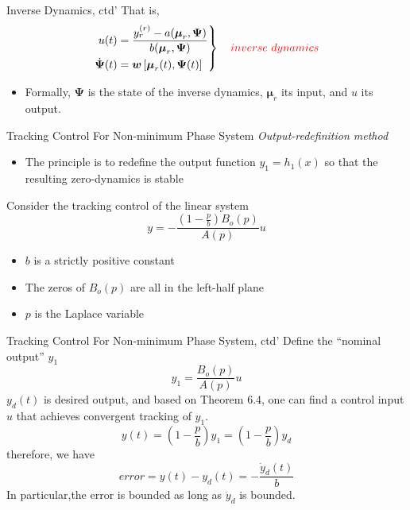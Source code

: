 \documentclass{beamer}
\renewcommand{\vec}[1]{\ensuremath{\boldsymbol{#1}}} %
\begin{document}
\begin{frame}{Inverse Dynamics, ctd'}
    That is, 
    \begin{equation}\label{inverse-dynamics}
      \left. \begin{aligned}
        u(t) &= \frac{y_{r}^{(r)}-a(\vec{\mu}_{r}, \vec{\Psi})}{b(\vec{\mu}_{r}, \vec{\Psi})} \\
        \dot{\vec{\Psi}}(t) &= \vec{w}\left[ \vec{\mu}_{r}(t),\vec{\Psi}(t) \right]
      \end{aligned} \right\} \quad {\color{red}inverse ~dynamics}
    \end{equation}
    \begin{itemize}
      \item Formally, $\vec{\Psi}$ is the state of the inverse dynamics, $\vec{\mu}_{r}$ its input, and $u$ its output.
    \end{itemize}
\end{frame}


\begin{frame}{Tracking Control For Non-minimum Phase System}
    \textit{\color{red}\large{Output-redefinition method}}
    \begin{itemize}
      \item The principle is to redefine the output function $y_{1}=h_{1}(x)$ so that the resulting zero-dynamics is stable
    \end{itemize}
    Consider the tracking control of the linear system
    \begin{equation}
        y=-\frac{\left(1-\frac{p}{b}\right) B_{o}(p)}{A(p)}u
    \end{equation}
    \begin{itemize}
      \item $b$ is a strictly positive constant
      \item The zeros of $B_{o}(p)$ are all in the left-half plane
      \item $p$ is the Laplace variable
    \end{itemize}
\end{frame}

\begin{frame}{Tracking Control For Non-minimum Phase System, ctd'}
    Define the {\color{red}``nominal output'' $y_{1}$}
    \begin{equation}\label{y1}
      y_{1}=\frac{B_{o}(p)}{A(p)}u
    \end{equation}
    $y_{d}(t)$ is desired output, and based on Theorem 6.4, one can find a control input $u$ that achieves {\color{red}convergent tracking of $y_{1}$}.
    \begin{equation}
        y(t)=\left(1-\frac{p}{b}\right) y_{1}=\left(1-\frac{p}{b}\right) y_{d}
    \end{equation}
    therefore, we have
    $$
        error = y(t)-y_{d}(t)=-\frac{\dot{y}_{d}(t)}{b}
    $$
    In particular,the error is {\color{red}bounded} as long as $\dot{y}_{d}$ is bounded.
\end{frame}
\end{document}
